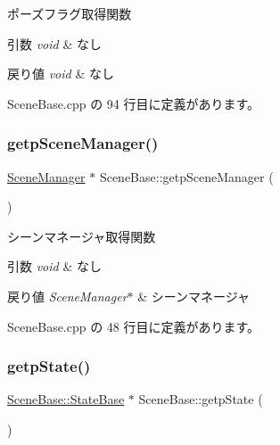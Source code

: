 ポーズフラグ取得関数 


\begin{DoxyParams}{引数}
{\em void} & なし \\
\hline
\end{DoxyParams}

\begin{DoxyRetVals}{戻り値}
{\em void} & なし \\
\hline
\end{DoxyRetVals}


 Scene\+Base.\+cpp の 94 行目に定義があります。

\mbox{\label{class_scene_base_a4c0b75d2f7ead08828f1e5064aa99720}} 
\subsubsection{\texorpdfstring{getp\+Scene\+Manager()}{getpSceneManager()}}
{\footnotesize\ttfamily \mbox{\hyperlink{class_scene_manager}{Scene\+Manager}} $\ast$ Scene\+Base\+::getp\+Scene\+Manager (\begin{DoxyParamCaption}{ }\end{DoxyParamCaption})}



シーンマネージャ取得関数 


\begin{DoxyParams}{引数}
{\em void} & なし \\
\hline
\end{DoxyParams}

\begin{DoxyRetVals}{戻り値}
{\em Scene\+Manager$\ast$} & シーンマネージャ \\
\hline
\end{DoxyRetVals}


 Scene\+Base.\+cpp の 48 行目に定義があります。

\mbox{\label{class_scene_base_acfea243cbece18d596f2dacad19a345c}} 
\subsubsection{\texorpdfstring{getp\+State()}{getpState()}}
{\footnotesize\ttfamily \mbox{\hyperlink{class_scene_base_1_1_state_base}{Scene\+Base\+::\+State\+Base}} $\ast$ Scene\+Base\+::getp\+State (\begin{DoxyParamCaption}{ }\end{DoxyParamCaption})}



